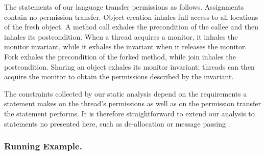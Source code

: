 \documentclass{llncs}
\begin{document}
The statements of our language transfer permissions as follows.
Assignments contain no permission transfer.  Object creation inhales
full access to all locations of the fresh object.  A method call
exhales the precondition of the callee and then inhales its
postcondition.  When a thread acquires a monitor, it inhales the
monitor invariant, while it exhales the invariant when it releases the
monitor. Fork exhales the precondition of the forked method, while
join inhales the postcondition.  Sharing an object exhales its monitor invariant;
threads can then acquire the monitor to obtain the permissions
described by the invariant.

The constraints collected by our static analysis depend on the
requirements a statement makes on the thread's permissions as well as
on the permission transfer the statement performs. It is therefore
straightforward to extend our analysis to statements no presented here,
such as de-allocation or message passing \cite{LM10}.







\goup
\goup
\subsubsection{Running Example.}
\label{sect:runningexample}
\end{document}
